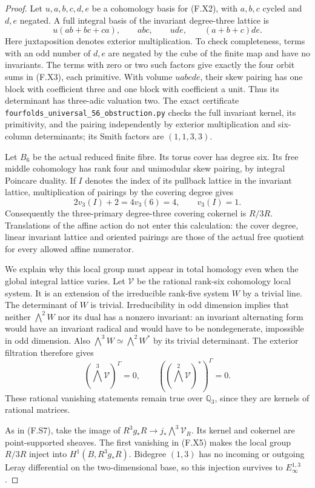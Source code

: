 \begin{proof}
Let $u,a,b,c,d,e$ be a cohomology basis for (F.X2), with
$a,b,c$ cycled and $d,e$ negated.  A full integral basis
of the invariant degree-three lattice is
\[
 u(ab+bc+ca),\qquad abc,\qquad ude,\qquad(a+b+c)de.
 \tag{F.X3}
\]
Here juxtaposition denotes exterior multiplication.
To check completeness, terms with an odd number of
$d,e$ are negated by the cube of the finite map and
have no invariants.  The terms with zero or two such
factors give exactly the four orbit sums in (F.X3),
each primitive.  With volume $uabcde$, their skew
pairing has one block with coefficient three and one
block with coefficient a unit.  Thus its determinant
has three-adic valuation two.  The exact certificate
\texttt{fourfolds\_universal\_56\_obstruction.py} checks
the full invariant kernel, its primitivity, and the
pairing independently by exterior multiplication and
six-column determinants; its Smith factors are
$(1,1,3,3)$.

Let $B_6$ be the actual reduced finite fibre.  Its torus
cover has degree six.  Its free middle cohomology has
rank four and unimodular skew pairing, by integral
Poincare duality.  If $I$ denotes the index of its
pullback lattice in the invariant lattice, multiplication
of pairings by the covering degree gives
\[
 2v_3(I)+2=4v_3(6)=4,
 \qquad v_3(I)=1.
 \tag{F.X4}
\]
Consequently the three-primary degree-three covering
cokernel is $R/3R$.  Translations of the affine action
do not enter this calculation: the cover degree,
linear invariant lattice and oriented pairings are
those of the actual free quotient for every allowed
affine numerator.

We explain why this local group must appear in total
homology even when the global integral lattice varies.
Let $\mathcal V$ be the rational rank-six cohomology
local system.  It is an extension of the irreducible
rank-five system $W$ by a trivial line.  The determinant
of $W$ is trivial.  Irreducibility in odd dimension
implies that neither $\bigwedge^2 W$ nor its dual
has a nonzero invariant: an invariant alternating
form would have an invariant radical and would have
to be nondegenerate, impossible in odd dimension.
Also $\bigwedge^3W\simeq\bigwedge^2W^*$ by its
trivial determinant.  The exterior filtration therefore
gives
\[
 (\bigwedge^3\mathcal V)^\Gamma=0,\qquad
 ((\bigwedge^2\mathcal V)^*)^\Gamma=0.
 \tag{F.X5}
\]
These rational vanishing statements remain true over
$\mathbb Q_3$, since they are kernels of rational
matrices.

As in (F.S7), take the image of
$R^3g_*R\to j_*\bigwedge^3\mathcal V_R$.
Its kernel and cokernel are point-supported sheaves.
The first vanishing in (F.X5) makes the local group
$R/3R$ inject into $H^1(B,R^3g_*R)$.  Bidegree $(1,3)$
has no incoming or outgoing Leray differential on
the two-dimensional base, so this injection survives
to $E_\infty^{1,3}$.


\end{proof}
